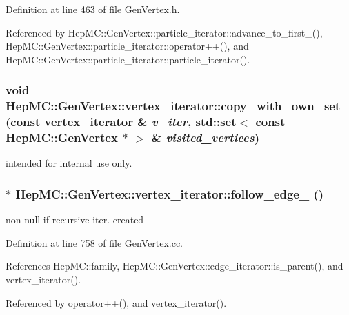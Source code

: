 Definition at line 463 of file Gen\-Vertex.h.

Referenced by Hep\-MC::Gen\-Vertex::particle\_\-iterator::advance\_\-to\_\-first\_\-(), Hep\-MC::Gen\-Vertex::particle\_\-iterator::operator++(), and Hep\-MC::Gen\-Vertex::particle\_\-iterator::particle\_\-iterator().
\subsubsection{\setlength{\rightskip}{0pt plus 5cm}void Hep\-MC::Gen\-Vertex::vertex\_\-iterator::copy\_\-with\_\-own\_\-set (const {\bf vertex\_\-iterator} \& {\em v\_\-iter}, std::set$<$ const {\bf Hep\-MC::Gen\-Vertex} $\ast$ $>$ \& {\em visited\_\-vertices})}\label{classHepMC_1_1GenVertex_1_1vertex__iterator_42545393a58a1151d75d8d680f7247e4}


intended for internal use only. 

\subsubsection{ $\ast$ Hep\-MC::Gen\-Vertex::vertex\_\-iterator::follow\_\-edge\_\- ()\hspace{0.3cm}{\tt  [protected]}}\label{classHepMC_1_1GenVertex_1_1vertex__iterator_ab33a3213925214c03aae774fb71c59b}


non-null if recursive iter. created 



Definition at line 758 of file Gen\-Vertex.cc.

References Hep\-MC::family, Hep\-MC::Gen\-Vertex::edge\_\-iterator::is\_\-parent(), and vertex\_\-iterator().

Referenced by operator++(), and vertex\_\-iterator().
